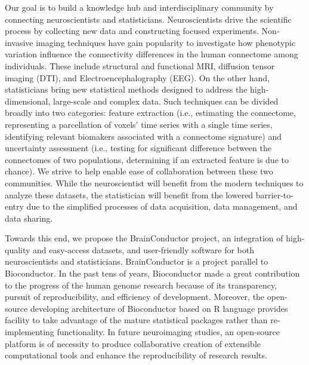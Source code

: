 \documentclass{nature}
\begin{document}
Our goal is to %
build a knowledge hub and interdisciplinary community by connecting
neuroscientists and statisticians.  Neuroscientists
drive the scientific process by collecting new data and constructing focused
experiments. Non-invasive imaging techniques have gain popularity to
investigate how phenotypic variation
influence the connectivity differences in the human
connectome among individuals\cite{sporns2005human,sporns2011human}. These
include structural and functional MRI,
diffusion tensor imaging (DTI), and Electroencephalography
(EEG).
On
the other hand, statisticians bring new statistical methods
designed to address the high-dimensional, large-scale and complex
data. Such techniques can be divided broadly into
two categories:
feature extraction (i.e., estimating the connectome, representing
a parcellation of voxels' time series with a single time series,
identifying relevant biomakers associated with a connectome signature)
and uncertainty assessment (i.e., testing for significant difference
between the connectomes of two populations, determining if 
an extracted feature is due to chance).
We strive to help enable ease of collaboration between these two communities.
While the neuroscientist will benefit from the modern techniques to
analyze these datasets, the statistician
will benefit from the lowered barrier-to-entry
due to the  simplified processes of data acquisition, data management, and data
sharing.


Towards this end, we propose the BrainConductor project, an integration of
high-quality and easy-access datasets, and user-friendly software for both
neuroscientists and statisticians. BrainConductor is a project parallel to
Bioconductor. In the past tens of years,
Bioconductor\cite{gentleman2004bioconductor} made a great contribution to the
progress of
the human genome research because of its transparency, pursuit of
reproducibility, and efficiency of development. Moreover, the open-source
developing architecture of Bioconductor based on R language provides facility to
take advantage of the mature statistical packages rather than re-implementing
functionality. In future neuroimaging studies, an open-source platform is of
necessity to produce collaborative creation of extensible computational tools
and enhance the reproducibility of research results.
\end{document}
